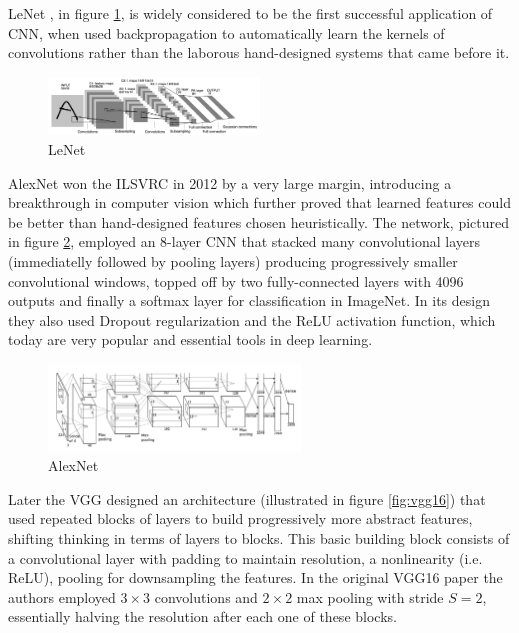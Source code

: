 LeNet \cite{lenet}, in figure \ref{fig:lenet}, is widely considered to be the first successful application of \ac{CNN}, when \citeauthor{lenet} used backpropagation to automatically learn the kernels of convolutions rather than the laborous hand-designed systems that came before it.

\begin{figure}[ht]
    \centering
    \includegraphics[width=0.5\textwidth]{figs/lenet.png}
    \caption{LeNet}
    \label{fig:lenet}
\end{figure}

AlexNet \cite{alexnet} won the \ac{ILSVRC} \cite{imagenet} in 2012 by a very large margin, introducing a breakthrough in computer vision which further proved that learned features could be better than hand-designed features chosen heuristically. The network, pictured in figure \ref{fig:alexnet}, employed an 8-layer \ac{CNN} that stacked many convolutional layers (immediatelly followed by pooling layers) producing progressively smaller convolutional windows, topped off by two fully-connected layers with 4096 outputs and finally a softmax layer for classification in ImageNet. In its design they also used Dropout regularization and the ReLU activation function, which today are very popular and essential tools in deep learning.

\begin{figure}[ht]
    \centering
    \includegraphics[width=0.6\textwidth]{figs/alexnet.png}
    \caption{AlexNet}
    \label{fig:alexnet}
\end{figure}

Later the \ac{VGG} designed an architecture (illustrated in figure \ref{fig:vgg16}) that used repeated blocks of layers to build progressively more abstract features, shifting thinking in terms of layers to blocks. This basic building block consists of a convolutional layer with padding to maintain resolution, a nonlinearity (i.e. ReLU), pooling for downsampling the features. In the original VGG16 paper \cite{vgg16} the authors employed $3 \times 3$ convolutions and $2 \times 2$ max pooling with stride $S = 2$, essentially halving the resolution after each one of these blocks.

